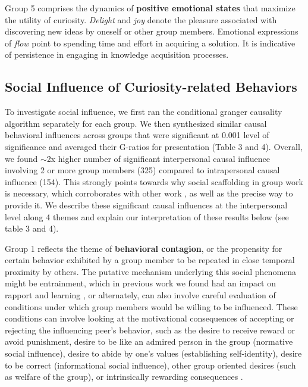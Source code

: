 \documentclass{llncs}
\begin{document}
Group 5 comprises the dynamics of {\bf positive emotional states} \cite{d2012dynamics} that maximize the utility of curiosity. {\em Delight} and {\em joy} denote the pleasure associated with discovering new ideas by oneself or other group members. Emotional expressions of {\em flow} point to spending time and effort in acquiring a solution. It is indicative of persistence in engaging in knowledge acquisition processes.
\vspace{-0.4cm}

\subsection{Social Influence of Curiosity-related Behaviors}
\vspace{-0.25cm}
To investigate social influence, we first ran the conditional granger causality algorithm separately for each group. We then synthesized similar causal behavioral influences across groups that were significant at 0.001 level of significance and averaged their G-ratios for presentation (Table 3 and 4). Overall, we found $\sim$2x higher number of significant interpersonal causal influence involving 2 or more group members (325) compared to intrapersonal causal influence (154). This strongly points towards why social scaffolding in group work is necessary, which corroborates with other work \cite{sinhaectel1}, as well as the precise way to provide it. We describe these significant causal influences at the interpersonal level along 4 themes and explain our interpretation of these results below (see table 3 and 4). 

Group 1 reflects the theme of {\bf behavioral contagion}, or the propensity for certain behavior exhibited by a group member to be repeated in close temporal proximity by others. The putative mechanism underlying this social phenomena might be entrainment, which in previous work we found had an impact on rapport and learning \cite{sinha2015we,sinha2015exploring}, or alternately, can also involve careful evaluation of conditions under which group members would be willing to be influenced. These conditions can involve looking at the motivational consequences of accepting or rejecting the influencing peer's behavior, such as the desire to receive reward or avoid punishment, desire to be like an admired person in the group (normative social influence), desire to abide by one’s values (establishing self-identity), desire to be correct (informational social influence), other group oriented desires (such as welfare of the group), or intrinsically rewarding consequences \cite{cartwright1953group}.
\end{document}
